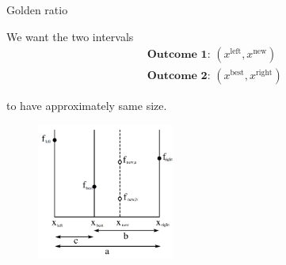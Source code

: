 \begin{vbframe}{Golden ratio}
\framebreak 

We want the two intervals
\begin{eqnarray*}
  && \textbf{Outcome 1: } (x^{\text{left}}, x^{\text{new}})\\
  && \textbf{Outcome 2: } (x^{\text{best}}, x^{\text{right}})
\end{eqnarray*}

to have approximately same size. 

\begin{figure}
\includegraphics[width=0.4\textwidth]{figure_man/goldensec.png}\\
\end{figure}

\end{vbframe}


